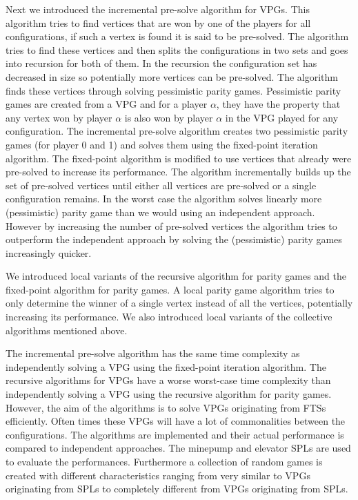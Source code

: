 Next we introduced the incremental pre-solve algorithm for VPGs. This algorithm tries to find vertices that are won by one of the players for all configurations, if such a vertex is found it is said to be pre-solved. The algorithm tries to find these vertices and then splits the configurations in two sets and goes into recursion for both of them. In the recursion the configuration set has decreased in size so potentially more vertices can be pre-solved. The algorithm finds these vertices through solving pessimistic parity games. Pessimistic parity games are created from a VPG and for a player $\alpha$, they have the property that any vertex won by player $\alpha$ is also won by player $\alpha$ in the VPG played for any configuration. The incremental pre-solve algorithm creates two pessimistic parity games (for player 0 and 1) and solves them using the fixed-point iteration algorithm. The fixed-point algorithm is modified to use vertices that already were pre-solved to increase its performance. The algorithm incrementally builds up the set of pre-solved vertices until either all vertices are pre-solved or a single configuration remains. In the worst case the algorithm solves linearly more (pessimistic) parity game than we would using an independent approach. However by increasing the number of pre-solved vertices the algorithm tries to outperform the independent approach by solving the (pessimistic) parity games increasingly quicker.

We introduced local variants of the recursive algorithm for parity games and the fixed-point algorithm for parity games. A local parity game algorithm tries to only determine the winner of a single vertex instead of all the vertices, potentially increasing its performance. We also introduced local variants of the collective algorithms mentioned above.

The incremental pre-solve algorithm has the same time complexity as independently solving a VPG using the fixed-point iteration algorithm. The recursive algorithms for VPGs have a worse worst-case time complexity than independently solving a VPG using the recursive algorithm for parity games. However, the aim of the algorithms is to solve VPGs originating from FTSs efficiently. Often times these VPGs will have a lot of commonalities between the configurations. The algorithms are implemented and their actual performance is compared to independent approaches. The minepump and elevator SPLs are used to evaluate the performances. Furthermore a collection of random games is created with different characteristics ranging from very similar to VPGs originating from SPLs to completely different from VPGs originating from SPLs.

